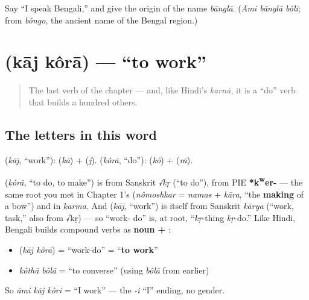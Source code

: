 \begin{tcolorbox}[breakable,colback=teal!4,colframe=teal!35!black,title={Before you move on}]
Say \textquotedblleft{}I speak Bengali,\textquotedblright{} and give the origin of the name \emph{bānglā}. (\emph{Āmi bānglā bôli}; from \emph{bôngo}, the ancient name of the Bengal region.)
\end{tcolorbox}
\section[\texorpdfstring{\bn{কাজ} \bn{করা} (kāj kôrā)}{কাজ করা (kāj kôrā)}]{  (kāj kôrā) — \textquotedblleft{}to work\textquotedblright{}}

\label{lesson:BN-C05-kaj-kora}



\begin{quote}
The last verb of the chapter — and, like Hindi's \emph{karnā}, it is a \textquotedblleft{}do\textquotedblright{} verb that builds a hundred others.
\end{quote}

\subsection*{The letters in this word}
\textbf{} (\emph{kāj}, \textquotedblleft{}work\textquotedblright{}): \textbf{} (\emph{kā}) + \textbf{} (\emph{j}). \textbf{} (\emph{kôrā}, \textquotedblleft{}do\textquotedblright{}): \textbf{} (\emph{kô}) +  (\emph{rā}).

\begin{cousinweb}
\textbf{} (\emph{kôrā}, \textquotedblleft{}to do, to make\textquotedblright{}) is from Sanskrit \emph{√kṛ} (\textquotedblleft{}to do\textquotedblright{}), from PIE \textbf{*k\textsuperscript{w}er-} — the same root you met in Chapter 1's \textbf{} (\emph{nômoshkar} = \emph{namas} + \emph{kāra}, \textquotedblleft{}the \textbf{making} of a bow\textquotedblright{}) and in \emph{karma}. And \textbf{} (\emph{kāj}, \textquotedblleft{}work\textquotedblright{}) is itself from Sanskrit \emph{kārya} (\textquotedblleft{}work, task,\textquotedblright{} also from √kṛ) — so \textquotedblleft{}work- do\textquotedblright{} is, at root, \textquotedblleft{}\emph{kṛ}-thing \emph{kṛ}-do.\textquotedblright{} Like Hindi, Bengali builds compound verbs as \textbf{noun + }:

\begin{itemize}
\raggedright
  \item \textbf{ } (\emph{kāj kôrā}) = \textquotedblleft{}work-do\textquotedblright{} = \textquotedblleft{}\textbf{to work}\textquotedblright{}
  \item \emph{kôthā bôlā} = \textquotedblleft{}to converse\textquotedblright{} (using \emph{bôlā} from earlier)
\end{itemize}

So \emph{āmi kāj kôri} = \textquotedblleft{}I work\textquotedblright{} — the \emph{-i} \textquotedblleft{}I\textquotedblright{} ending, no gender.
\end{cousinweb}

